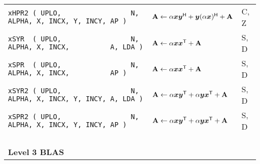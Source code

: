 \documentclass[10pt,a3paper, landscape]{article}
\newcommand{\T}{\mathsf{T}}
\renewcommand{\H}{\mathsf{H}}
\begin{document}
\begin{tabular}{ll>{\ttfamily}l}
		\verb|xHPR2 ( UPLO,                 N, ALPHA, X, INCX, Y, INCY, AP )                           | & $\vb{A} \gets \alpha \vb*{x}\vb*{y}^{\H} + \vb*{y}(\alpha \vb*{x})^{\H} + \vb{A}$                                                                                                                                                                            & C, Z               \\
		\verb|xSYR  ( UPLO,                 N, ALPHA, X, INCX,          A, LDA )                       | & $\vb{A} \gets \alpha \vb*{x}\vb*{x}^{\T} + \vb{A}$                                                                                                                                                                                                           & S, D               \\
		\verb|xSPR  ( UPLO,                 N, ALPHA, X, INCX,          AP )                           | & $\vb{A} \gets \alpha \vb*{x}\vb*{x}^{\T} + \vb{A}$                                                                                                                                                                                                           & S, D               \\
		\verb|xSYR2 ( UPLO,                 N, ALPHA, X, INCX, Y, INCY, A, LDA )                       | & $\vb{A} \gets \alpha \vb*{x}\vb*{y}^{\T} + \alpha \vb*{y}\vb*{x}^{\T} + \vb{A}$                                                                                                                                                                              & S, D               \\
		\verb|xSPR2 ( UPLO,                 N, ALPHA, X, INCX, Y, INCY, AP )                           | & $\vb{A} \gets \alpha \vb*{x}\vb*{y}^{\T} + \alpha \vb*{y}\vb*{x}^{\T} + \vb{A}$                                                                                                                                                                              & S, D               \\
		\verb|                                                                                         | &                                                                                                                                                                                                                                                              &                    \\
		\multicolumn{3}{l}{\Large{\textbf{Level 3 BLAS}}}                                                                                                                                                                                                                                                                                                                                    \\

\end{tabular}
\end{document}
